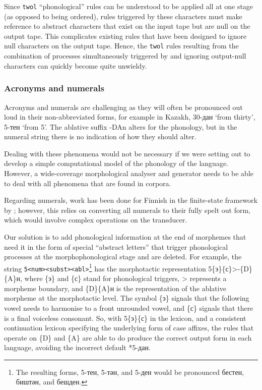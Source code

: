 \documentclass[a4paper,11pt,twocolumn]{article}
\begin{document}
Since \texttt{twol} ``phonological'' rules can be understood to be applied all at one stage (as opposed to being ordered), rules triggered by these characters must make reference to abstract characters that exist on the input tape but are null on the output tape.  This complicates existing rules that have been designed to ignore null characters on the output tape.  Hence, the \texttt{twol} rules resulting from the combination of processes simultaneously triggered by and ignoring output-null characters can quickly become quite unwieldy.


\subsubsection{Acronyms and numerals}
Acronyms and numerals are challenging as they will often be pronounced out loud
   in their non-abbreviated forms, for example in Kazakh, 30-дан `from thirty', 5-тен `from 5'. The ablative
   suffix -DAn alters for the phonology, but in the numeral string there is no indication of how they should alter.

Dealing with these phenomena would not be necessary if we were setting out to develop a simple computational
model of the phonology of the language. However, a wide-coverage morphological analyser and generator needs to be 
able to deal with all phenomena that are found in corpora.

Regarding numerals, work has been done for Finnish in the finite-state framework by \citep{karttunen06}; however, this relies on converting all numerals to their fully spelt out form, which would involve complex operations 
on the transducer. 

Our solution is to add phonological information at the end of morphemes that need it in the form of special ``abstract letters'' that trigger phonological processes at the morphophonological stage and are deleted. For example, the string \texttt{5<num><subst><abl>}\footnote{The resulting forms, 5-тен, 5-тән, and 5-ден would be pronounced бестен, биштән, and бешден.} has
the morphotactic representation 5\{э\}\{с\}>-\{D\}\{A\}н, where \{э\} and \{с\} stand for phonological triggers, > represents a morpheme boundary, and \{D\}\{A\}н is the representation of the ablative morpheme at the morphotactic level.  The symbol \{э\} signals that the following vowel needs to harmonise to a front unrounded vowel, and \{с\} signals that there is a final voiceless consonant.  So, with 5\{э\}\{с\} in the lexicon, and a consistent continuation lexicon specifying the underlying form of case affixes, the rules that operate on \{D\} and \{A\} are able to do produce the correct output form in each language, avoiding the incorrect default *5-дан.
\end{document}
